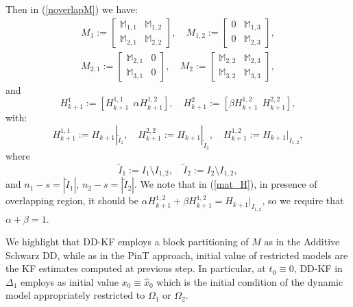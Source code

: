 \documentclass[smallcondensed]{svjour3}
\begin{document}
\begin{itemize}
Then  in (\ref{noverlapM}) we have:  \begin{equation}\label{deco_M2}
\begin{array}{lllllllllll}
M_{1}:=\left[\begin{array}{cc}
\mathbb{M}_{1,1} & \mathbb{M}_{1,2}\\
\mathbb{M}_{2,1}  & \mathbb{M}_{2,2} 
 \end{array} \right], \quad {M}_{1,2}:=\left[\begin{array}{cc}
0 & \mathbb{M}_{1,3}\\
0  & \mathbb{M}_{2,3} 
 \end{array} \right],\\
{M}_{2,1}:=\left[\begin{array}{cc}
\mathbb{M}_{2,1} & 0\\
\mathbb{M}_{3,1}  & 0 
 \end{array} \right], \quad M_{2}:=\left[\begin{array}{cc}
\mathbb{M}_{2,2} & \mathbb{M}_{2,3}\\
\mathbb{M}_{3,2}  & \mathbb{M}_{3,3} 
 \end{array} \right],
 \end{array}
\end{equation}
and 
\begin{equation}\label{mat_H}
    H_{k+1}^{1}:=\left[H_{k+1}^{1,1} \ \ \alpha H_{k+1}^{1,2}\right], \quad  H_{k+1}^{2}:=\left[\beta H_{k+1}^{1,2} \  \  H_{k+1}^{2,2}\right] ,
\end{equation}
 with:
\begin{equation}
    H_{k+1}^{1,1}:=H_{k+1}|_{\tilde{I}_{1}}, \quad H_{k+1}^{2,2}:=H_{k+1}|_{\tilde{I}_{2}}, \quad H_{k+1}^{1,2}:=H_{k+1}|_{{I}_{1,2}},  
\end{equation}
where 
\begin{equation}\label{set_indici_tilde}
\tilde{I}_{1}:=I_{1} \setminus  {I}_{1,2}, \quad \tilde{I}_{2}:=I_{2} \setminus  {I}_{1,2},
\end{equation}
and $n_{1}-s=|\tilde{I}_{1}|$, $n_{2}-s=|\tilde{I}_{2}|$.  We note that in (\ref{mat_H}), in presence of overlapping region, it should be $ \alpha H_{k+1}^{1,2}+ \beta H_{k+1}^{1,2}= H_{k+1}|_{{I}_{1,2}}$, so we require that  $\alpha + \beta = 1$.
\end{itemize}


\noindent We highlight that  DD-KF  employs  a block partitioning of $M$ as in the Additive  Schwarz DD, while as in the PinT approach, initial value of  restricted models are the KF estimates computed  at previous step.     In particular, at $t_{0}\equiv 0$, DD-KF in $\Delta_{1}$ employs as initial value $x_{0}\equiv \widehat{x}_{0}$ which is the initial condition of the dynamic model appropriately restricted to  $\Omega_{1}$ or $\Omega_{2}$.\\ %
\end{document}
